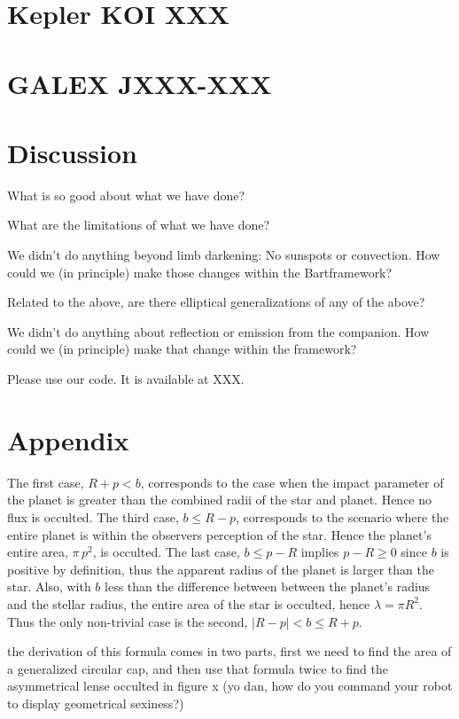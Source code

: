 \documentclass[12pt,preprint]{aastex}
\newcommand{\project}[1]{{\sffamily #1}}
\newcommand{\bart}{\project{Bart}}
\begin{document}
\section{Kepler KOI XXX}

\section{GALEX JXXX-XXX}

\section{Discussion}

What is so good about what we have done?

What are the limitations of what we have done?

We didn't do anything beyond limb darkening:  No sunspots or convection.
How could we (in principle) make those changes within the \bart framework?

Related to the above, are there elliptical generalizations of any of the above?

We didn't do anything about reflection or emission from the companion.
How could we (in principle) make that change within the framework?

Please use our code.  It is available at XXX.

\acknowledgments

\section{Appendix}

The first case, $R+p < b$, corresponds to the case when the impact parameter of
the planet is greater than the combined radii of the star and planet. Hence no
flux is occulted.  The third case, $b \leq R-p$, corresponds to the scenario
where the entire planet is within the observers perception of the star.  Hence
the planet's entire area, $\pi \, p^2$, is occulted.  The last case, $b \leq p-R$ implies
$p-R \geq 0$ since $b$ is positive by definition, thus the apparent radius of the
planet is larger than the star.  Also, with $b$ less than the difference between
between the planet's radius and the stellar radius, the entire area
of the star is occulted, hence $\lambda = \pi R^2$.  Thus the only non-trivial
case is the second, $|R-p| < b \leq R+p$.

the derivation of this formula comes in two parts, first we need to find the area of
a generalized circular cap, and then use that formula twice to find the asymmetrical
lense occulted in figure x (yo dan, how do you command your robot to display geometrical sexiness?)
\end{document}
